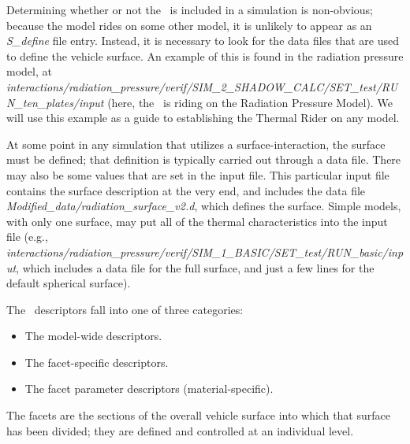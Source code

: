 %
%
% 
%

\label{sec:user_analysis}
Determining whether or not the \ThermalRiderDesc\ is included in a simulation is
non-obvious; because the model rides on some other model, it is unlikely to
appear as an \textit{S\_define} file entry.  Instead, it is necessary to look
for the data files that are used to define the vehicle surface.  An example of
this is found in the radiation pressure model, at \newline
\textit{interactions/radiation\_pressure/verif/SIM\_2\_SHADOW\_CALC/SET\_test/RUN\_ten\_plates/input} \newline
(here, the \ThermalRiderDesc\ is riding on the Radiation Pressure Model).  We will use this example as a guide to establishing the Thermal Rider on any model.

At some point in any simulation that utilizes a surface-interaction, the surface must be defined; that definition is typically carried out through a data file.  There may also be some values that are set in the input file.  This particular input file contains the surface description at the very end, and includes the data file \textit{Modified\_data/radiation\_surface\_v2.d}, which defines the surface.  Simple models, with only one surface, may put all of the thermal characteristics into the input file (e.g., \textit{interactions/radiation\_pressure/verif/SIM\_1\_BASIC/SET\_test/RUN\_basic/input}, which includes a data file for the full surface, and just a few lines for the default spherical surface).

The \ThermalRiderDesc\ descriptors fall into one of three categories:
\begin{itemize}
\item  The model-wide descriptors.
\item The facet-specific descriptors.
\item The facet parameter descriptors (material-specific).  
\end{itemize}
The facets are the sections of the overall vehicle surface into which that surface has been divided; they are defined and controlled at an individual level.

